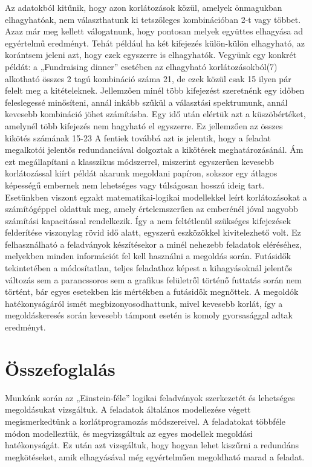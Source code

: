 \documentclass[12pt,a4paper,twoside, openright]{report}
\begin{document}
    Az adatokból kitűnik, hogy azon korlátozások közül, amelyek önmagukban elhagyhatóak, nem választhatunk ki tetszőleges kombinációban 2-t vagy többet.
    Azaz már meg kellett válogatnunk, hogy pontosan melyek együttes elhagyása ad egyértelmű eredményt.
    Tehát például ha két kifejezés külön-külön elhagyható, az korántsem jeleni azt, hogy ezek egyszerre is elhagyhatók.
    Vegyünk egy konkrét példát: a „Fundraising dinner” esetében az elhagyható korlátozásokból(7) alkotható összes 2 tagú kombináció száma 21, de ezek közül csak 15 ilyen pár felelt meg a kitételeknek.
    Jellemzően minél több kifejezést szeretnénk egy időben feleslegessé minősíteni, annál inkább szűkül a választási spektrumunk, annál kevesebb kombináció jöhet számításba.
    Egy idő után elértük azt a küszöbértéket, amelynél több kifejezés nem hagyható el egyszerre.
    Ez jellemzően az összes kikötés számának 15-23%
    A fentiek továbbá azt is jelentik, hogy a feladat megalkotói jelentős redundanciával dolgoztak a kikötések meghatározásánál.
    Ám ezt megállapítani a klasszikus módszerrel, miszerint egyszerűen kevesebb korlátozással kiírt példát akarunk megoldani papíron, sokszor egy átlagos képességű embernek nem lehetséges vagy túlságosan hosszú ideig tart.
    Esetünkben viszont egzakt matematikai-logikai modellekkel leírt korlátozásokat a számítógéppel oldattuk meg, amely értelemszerűen az emberénél jóval nagyobb számítási kapacitással rendelkezik.
    Így a nem feltétlenül szükséges kifejezések felderítése viszonylag rövid idő alatt, egyszerű eszközökkel kivitelezhető volt.
    Ez felhasználható a feladványok készítésekor a minél nehezebb feladatok eléréséhez, melyekben minden információt fel kell használni a megoldás során.
    Futásidők tekintetében a módosítatlan, teljes feladathoz képest a kihagyásoknál jelentős változás sem a parancssoros sem a grafikus felületről történő futtatás során nem történt, bár egyes esetekben kis mértékben a futásidők megnőttek.
    A megoldók hatékonyságáról ismét megbizonyosodhattunk, mivel kevesebb korlát, így a megoldáskeresés során kevesebb támpont esetén is komoly gyorsasággal adtak eredményt.


\chapter{Összefoglalás}

    Munkánk során az „Einstein-féle” logikai feladványok szerkezetét és lehetséges megoldásukat vizsgáltuk.
    A feladatok általános modellezése végett megismerkedtünk a korlátprogramozás módszereivel.
    A feladatokat többféle módon modelleztük, és megvizsgáltuk az egyes modellek megoldási hatékonyságát.
    Ez után azt vizsgáltuk, hogy hogyan lehet kiszűrni a redundáns megkötéseket, amik elhagyásával még egyértelműen megoldható marad a feladat.
			
\clearpage
{}

				
				
\end{document}
